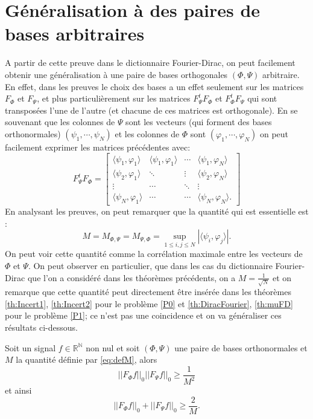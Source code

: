 \section{Généralisation à des paires de bases arbitraires}
	A partir de cette preuve dans le dictionnaire Fourier-Dirac, on peut facilement obtenir une généralisation à une paire de bases orthogonales $(\Phi, \Psi)$ arbitraire.
	En effet, dans les preuves le choix des bases a un effet seulement sur les matrices $F_{\Phi}$ et $F_{\Psi}$, et plus particulièrement sur les matrices $F_{\Psi}^t F_{\Phi}$ et $F_{\Phi}^t F_{\Psi}$ qui sont transposées l'une de l'autre (et chacune de ces matrices est orthogonale).
	En se souvenant que les colonnes de $\Psi$ sont les vecteurs (qui forment des bases orthonormales) $(\psi_1, \cdots, \psi_N)$ et les colonnes de $\Phi$ sont $(\varphi_1,\cdots,\varphi_N)$ on peut facilement exprimer les matrices précédentes avec:
	\begin{equation}
		F_{\Psi}^tF_{\Phi} = \begin{bmatrix}
			\langle \psi_1, \varphi_1 \rangle & 	\langle \psi_1, \varphi_1 \rangle	&\cdots 	&	\langle \psi_1, \varphi_N \rangle\\
			\langle \psi_2, \varphi_1 \rangle & 	\ddots 					& \vdots 	&	\langle \psi_2, \varphi_N \rangle \\
			\vdots 				& \cdots 				&\ddots 	 	&	\vdots \\
			\langle \psi_N, \varphi_1 \rangle & \cdots 				& \cdots 		&	 \langle \psi_N, \varphi_N \rangle. 
		\end{bmatrix}
	\end{equation}
	En analysant les preuves, on peut remarquer que la quantité qui est essentielle est :
	\begin{equation}\label{eq:defM}
		M = M_{\Phi, \Psi} = M_{\Psi, \Phi} = \sup_{1\leq i,j\leq N} |\langle \psi_i, \varphi_j \rangle|.
	\end{equation}
	On peut voir cette quantité comme la corrélation maximale entre les vecteurs de $\Phi$ et $\Psi$.
	\newline
	On peut observer en particulier, que dans les cas du dictionnaire Fourier-Dirac que l'on a considéré dans les théorèmes précédents, on a $M=\frac{1}{\sqrt{N}}$ et on remarque que cette quantité peut directement être insérée dans les théorèmes \ref{th:Incert1}, \ref{th:Incert2} pour le problème \ref{P0} et \ref{th:DiracFourier}, \ref{th:muFD} pour le problème \ref{P1}; ce n'est pas une coincidence et on va généraliser ces résultats ci-dessous.
	\begin{theoreme}\label{th:IncertGen1}
		Soit un signal $f\in \mathbb{R^N}$ non nul et soit $(\Phi, \Psi)$ une paire de bases orthonormales et $M$ la quantité définie par \ref{eq:defM}, alors
		\begin{equation}
			||F_\Phi f||_0 ||F_\Psi f||_0 \geq \frac{1}{M^2} 	
		\end{equation}
		et ainsi
		\begin{equation}
			||F_\Phi f||_0 + ||F_\Psi f||_0 \geq \frac{2}{M}. 	
		\end{equation}
	\end{theoreme}
